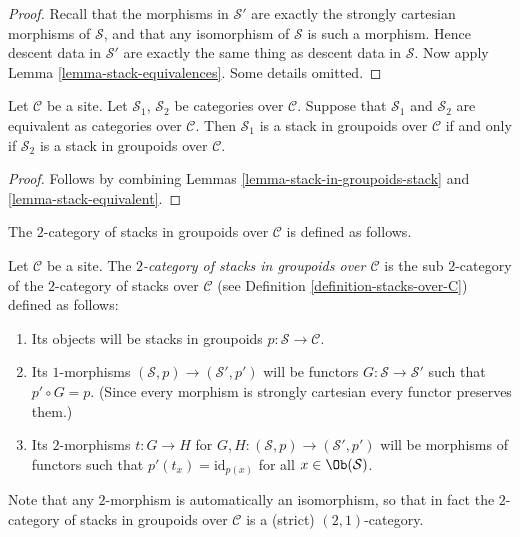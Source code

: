 \begin{proof}
Recall that the morphisms in $\mathcal{S}'$ are exactly the
strongly cartesian morphisms of $\mathcal{S}$, and that any isomorphism of
$\mathcal{S}$ is such a morphism. Hence descent data in $\mathcal{S}'$
are exactly the same thing as descent data in $\mathcal{S}$. Now apply
Lemma \ref{lemma-stack-equivalences}. Some details omitted.
\end{proof}

\begin{lemma}
\label{lemma-stack-in-groupoids-equivalent}
Let $\mathcal{C}$ be a site.
Let $\mathcal{S}_1$, $\mathcal{S}_2$ be categories over $\mathcal{C}$.
Suppose that $\mathcal{S}_1$ and $\mathcal{S}_2$ are equivalent
as categories over $\mathcal{C}$.
Then $\mathcal{S}_1$ is a stack in groupoids over $\mathcal{C}$ if and only if
$\mathcal{S}_2$ is a stack in groupoids over $\mathcal{C}$.
\end{lemma}

\begin{proof}
Follows by combining
Lemmas \ref{lemma-stack-in-groupoids-stack} and \ref{lemma-stack-equivalent}.
\end{proof}

\noindent
The $2$-category of stacks in groupoids over $\mathcal{C}$
is defined as follows.

\begin{definition}
\label{definition-stacks-in-groupoids-over-C}
Let $\mathcal{C}$ be a site.
The {\it $2$-category of stacks in groupoids over $\mathcal{C}$}
is the sub $2$-category of the $2$-category of stacks
over $\mathcal{C}$ (see Definition \ref{definition-stacks-over-C})
defined as follows:
\begin{enumerate}
\item Its objects will be stacks in groupoids
$p : \mathcal{S} \to \mathcal{C}$.
\item Its $1$-morphisms $(\mathcal{S}, p) \to (\mathcal{S}', p')$
will be functors $G : \mathcal{S} \to \mathcal{S}'$ such that
$p' \circ G = p$. (Since every morphism is strongly cartesian
every functor preserves them.)
\item Its $2$-morphisms $t : G \to H$ for
$G, H : (\mathcal{S}, p) \to (\mathcal{S}', p')$
will be morphisms of functors
such that $p'(t_x) = \text{id}_{p(x)}$
for all $x \in \Ob(\mathcal{S})$.
\end{enumerate}
\end{definition}

\noindent
Note that any $2$-morphism is automatically an isomorphism, so
that in fact the $2$-category of stacks in groupoids over $\mathcal{C}$
is a (strict) $(2, 1)$-category.

